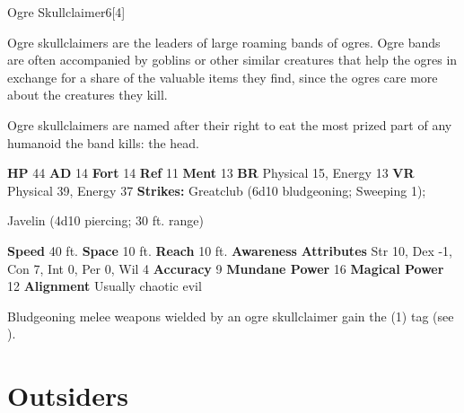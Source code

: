   \begin{monsubsection}{Ogre Skullclaimer}{6}[4]
    \vspace{-1em}\vspace{-1em}
    \vspace{0em}

    
          Ogre skullclaimers are the leaders of large roaming bands of ogres.
          Ogre bands are often accompanied by goblins or other similar creatures that help the ogres in exchange for a share of the valuable items they find, since the ogres care more about the creatures they kill.
        
          Ogre skullclaimers are named after their right to eat the most prized part of any humanoid the band kills: the head.
        

    \begin{spellcontent}
      \begin{spelltargetinginfo}
        \pari \textbf{HP} 44 \monsep
          \textbf{AD} 14 \monsep
          \textbf{Fort} 14 \monsep
          \textbf{Ref} 11 \monsep
          \textbf{Ment} 13
        \pari \textbf{BR} Physical 15, Energy 13 \monsep
        \textbf{VR} Physical 39, Energy 37
        \pari \textbf{Strikes:}
            Greatclub  (6d10 bludgeoning; Sweeping 1);
\par Javelin  (4d10 piercing; 30 ft. range)
      \end{spelltargetinginfo}
    \end{spellcontent}
    \begin{monsterfooter}
      \pari \textbf{Speed} 40 ft. \monsep
        \textbf{Space} 10 ft. \monsep
        \textbf{Reach} 10 ft.
      \pari \textbf{Awareness} 
      \pari \textbf{Attributes}
        Str 10, Dex -1,
        Con 7, Int 0,
        Per 0, Wil 4
      \pari \textbf{Accuracy} 9 \monsep
        \textbf{Mundane Power} 16 \monsep
      \textbf{Magical Power} 12
      \pari \textbf{Alignment} Usually chaotic evil
    \end{monsterfooter}
  \end{monsubsection}
            Bludgeoning melee weapons wielded by an ogre skullclaimer gain the  (1) tag (see ).
  
  
        \newpage
        \section{Outsiders}

